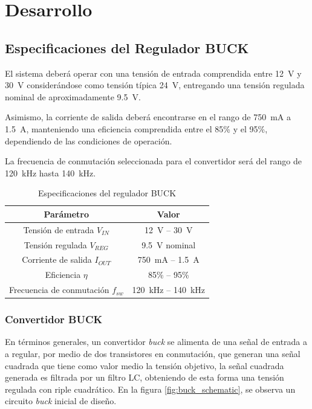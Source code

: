 \documentclass[]{article}
\begin{document}
	
	
	
	
	\section{Desarrollo}
	
	\subsection{Especificaciones del Regulador BUCK}
	El sistema deberá operar con una tensión de entrada comprendida entre \SI{12}{V} y \SI{30}{V} considerándose como tensión típica \SI{24}{V}, entregando una tensión regulada nominal de aproximadamente \SI{9.5}{V}. 
	
	Asimismo, la corriente de salida deberá encontrarse en el rango de \SI{750}{mA} a \SI{1.5}{A}, manteniendo una eficiencia comprendida entre el 85\% y el 95\%, dependiendo de las condiciones de operación.
	
	La frecuencia de conmutación seleccionada para el convertidor será del rango de 
	\SI{120}{kHz} hasta \SI{140}{kHz}.
	
	\renewcommand{\arraystretch}{1.3}
		\begin{table}[H]
		\centering
		\caption{Especificaciones del regulador BUCK}
		\label{tab:spec_buck}
		\begin{tabular}{|c|c|}
			\hline
			Parámetro & Valor \\  \hline \hline
			Tensión de entrada $V_{IN}$ & \SI{12}{V} -- \SI{30}{V} \\ \hline
			Tensión regulada $V_{REG}$ & \SI{9.5}{V} nominal \\ \hline
			Corriente de salida $I_{OUT}$ & \SI{750}{mA} -- \SI{1.5}{A} \\ \hline
			Eficiencia $\eta$ & 85\% -- 95\% \\ \hline
			Frecuencia de conmutación $f_{sw}$ & \SI{120}{kHz} -- \SI{140}{kHz} \\ \hline
		\end{tabular}
	\end{table}
	
	\subsubsection{Convertidor BUCK}
	
	En términos generales, un convertidor \textit{buck} se alimenta de una señal de entrada a a regular, por medio de dos transistores en conmutación, que generan una señal cuadrada que tiene como valor medio la tensión objetivo, la señal cuadrada generada es filtrada por un filtro LC, obteniendo de esta forma una tensión regulada con riple cuadrático. En la figura \ref{fig:buck_schematic}, se observa un circuito \textit{buck} inicial de diseño.
	
\end{document}
